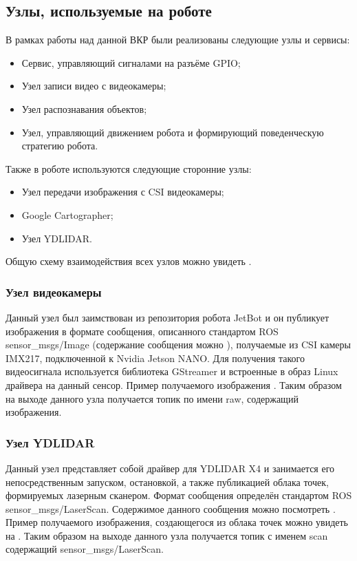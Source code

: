\subsection{Узлы, используемые на роботе}
В рамках работы над данной ВКР были реализованы следующие узлы и сервисы:
\begin{itemize}
\item Сервис, управляющий сигналами на разъёме GPIO; 
\item Узел записи видео с видеокамеры;
\item Узел распознавания объектов;
\item Узел, управляющий движением робота и формирующий поведенческую стратегию робота.
\end{itemize}

Также в роботе используются следующие сторонние узлы:
\begin{itemize}
\item Узел передачи изображения с CSI видеокамеры;
\item Google Cartographer;
\item Узел YDLIDAR.
\end{itemize}

Общую схему взаимодействия всех узлов можно увидеть .

\subsubsection{Узел видеокамеры}
Данный узел был заимствован из репозитория робота JetBot и он публикует изображения в формате сообщения, описанного стандартом ROS sensor\_msgs/Image (содержание сообщения можно ), получаемые из CSI камеры IMX217, подключенной к Nvidia Jetson NANO. Для получения такого видеосигнала используется библиотека GStreamer и встроенные в образ Linux драйвера на данный сенсор. Пример получаемого изображения . Таким образом на выходе данного узла получается топик по имени raw, содержащий изображения.

\subsubsection{Узел YDLIDAR}
Данный узел представляет собой драйвер для YDLIDAR X4 и занимается его непосредственным запуском, остановкой, а также публикацией облака точек, формируемых лазерным сканером. Формат сообщения определён стандартом ROS sensor\_msgs/LaserScan.  Содержимое данного сообщения можно посмотреть . Пример получаемого изображения, создающегося из облака точек можно увидеть на . Таким образом на выходе данного узла получается топик с именем scan содержащий sensor\_msgs/LaserScan.

